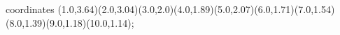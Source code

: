 					coordinates { (1.0,3.64)(2.0,3.04)(3.0,2.0)(4.0,1.89)(5.0,2.07)(6.0,1.71)(7.0,1.54)(8.0,1.39)(9.0,1.18)(10.0,1.14)};